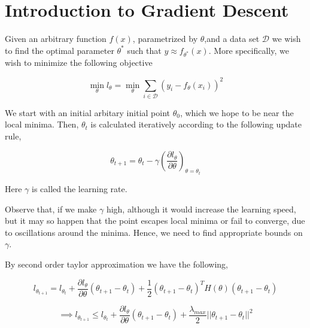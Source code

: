 \documentclass[11pt, twosides]{article}
\begin{document}

\section{Introduction to Gradient Descent}
Given an arbitrary function $f(x)$, parametrized by $\theta$,and a data set $\mathcal{D}$ we wish to find the optimal parameter $\theta^{*}$ such that $y \approx f_{\theta^{*}}(x)$. More specifically, we wish to minimize the following objective 



\begin{equation}
\min_{\theta} l_{\theta} = \min_{\theta} \sum_{i \in \mathcal{D}}^{} (y_i - f_{\theta}(x_i))^2
\end{equation}

We start with an initial arbitary initial point $\theta_{0}$, which we hope to be near the local minima. Then, $\theta_{t}$ is calculated iteratively according to the following update rule, 

\begin{equation}
    \theta_{t+1} = \theta_{t} - \gamma \left(\frac{\partial  l_{\theta}}{\partial \theta} \right)_{\theta = \theta_{t}}
\end{equation}

Here $\gamma$ is called the learning rate. 

Observe that, if we make $\gamma$ high, although it would increase the learning speed, but it may so happen that the point escapes local minima or fail to converge, due to oscillations around the minima. Hence, we need to find appropriate bounds on $\gamma$. 

By second order taylor approximation we have the following, 

\begin{equation}
    l_{\theta_{t+1}} = l_{\theta_{t}} + \frac{\partial  l_{\theta}}{\partial \theta}(\theta_{t+1} - \theta_{t}) + \frac{1}{2}(\theta_{t+1} - \theta_{t})^{T}H(\theta)(\theta_{t+1} - \theta_{t})
\end{equation}

\begin{equation}    
   \implies  l_{\theta_{t+1}} \leq l_{\theta_{t}} + \frac{\partial  l_{\theta}}{\partial \theta}(\theta_{t+1} - \theta_{t}) + \frac{\lambda_{max}}{2}||\theta_{t+1} - \theta_{t}||^{2}
\end{equation}
\end{document}
